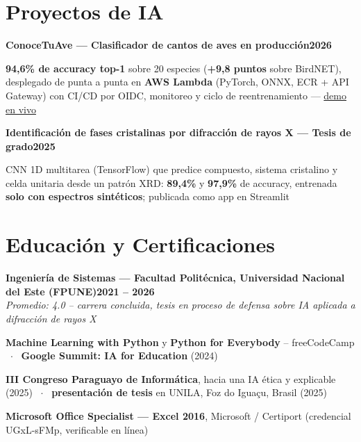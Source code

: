 \documentclass[letterpaper,10pt]{article}
\newcommand{\heading}[2]{
  \hspace{10pt}#1\hfill#2\\
}
\newcommand{\headingBf}[2]{
  \heading{\textbf{#1}}{\textbf{#2}}
}
\newcommand{\headingIt}[2]{
  \heading{\textit{#1}}{\textit{#2}}
}
\newenvironment{resume_list}{
  \vspace{-7pt}
  \begin{itemize}[itemsep=-2px, parsep=1pt, leftmargin=30pt]
}{
  \end{itemize}
}
\begin{document}

  \section{Proyectos de IA}

  \headingBf{ConoceTuAve — Clasificador de cantos de aves en producción}{2026}
  \begin{resume_list}
    \item \textbf{94,6\% de accuracy top-1} sobre 20 especies (\textbf{+9,8 puntos} sobre BirdNET), desplegado de punta a punta en \textbf{AWS Lambda} (PyTorch, ONNX, ECR + API Gateway) con CI/CD por OIDC, monitoreo y ciclo de reentrenamiento — \href{https://huggingface.co/spaces/placaflaca/bird-classifier-py}{demo en vivo}
  \end{resume_list}

  \headingBf{Identificación de fases cristalinas por difracción de rayos X — Tesis de grado}{2025}
  \begin{resume_list}
    \item CNN 1D multitarea (TensorFlow) que predice compuesto, sistema cristalino y celda unitaria desde un patrón XRD: \textbf{89,4\%} y \textbf{97,9\%} de accuracy, entrenada \textbf{solo con espectros sintéticos}; publicada como app en Streamlit
  \end{resume_list}


  \section{Educación y Certificaciones}

  \headingBf{Ingeniería de Sistemas — Facultad Politécnica, Universidad Nacional del Este (FPUNE)}{2021 -- 2026}
  \headingIt{Promedio: 4.0 -- carrera concluida, tesis en proceso de defensa sobre IA aplicada a difracción de rayos X}{}
  \begin{resume_list}
    \item \textbf{Machine Learning with Python} y \textbf{Python for Everybody} -- freeCodeCamp ~$\cdot$~ \textbf{Google Summit: IA for Education} (2024)
    \item \textbf{III Congreso Paraguayo de Informática}, hacia una IA ética y explicable (2025) ~$\cdot$~ \textbf{presentación de tesis} en UNILA, Foz do Iguaçu, Brasil (2025)
    \item \textbf{Microsoft Office Specialist — Excel 2016}, Microsoft / Certiport (credencial UGxL-sFMp, verificable en línea)
  \end{resume_list}
\end{document}
